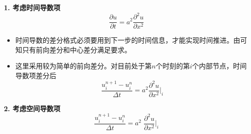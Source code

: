 \noindent \textbf{1. 考虑时间导数项}
\begin{equation*}
	\boxed{\dfrac{\partial u}{\partial t}} = a^2 \dfrac{\partial^2 u}{\partial x^2}
\end{equation*}
\begin{itemize}
	\item 时间导数的差分格式必须要用到下一步的时间信息，才能实现时间推进。由\ptref[差分的四种表示形式]可知只有前向差分和中心差分满足要求。
	\item 这里采用较为简单的前向差分。对目前处于第$n$个时刻的第$i$个内部节点，时间导数项差分后
	\begin{equation}
		\dfrac{u_i^{n+1}-u_i^n}{\Delta t} = a^2 \dfrac{\partial^2 u}{\partial x^2}\Bigg|_i
	\end{equation}
\end{itemize}
\noindent \textbf{2. 考虑空间导数项}
\begin{equation*}
	\dfrac{u_i^{n+1}-u_i^n}{\Delta t} = a^2\,\, \boxed{\dfrac{\partial^2 u}{\partial x^2}\Bigg|_i}
\end{equation*}

